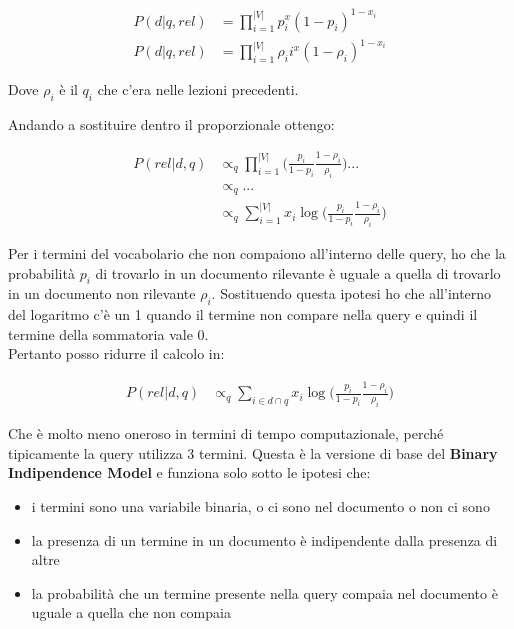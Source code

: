 \begin{align*}
P(d|q,rel) &= \prod\limits_{i = 1}^{|V|} p_{i}^x(1 - p_i)^{1-x_i} \\
P(d|q,rel) &= \prod\limits_{i = 1}^{|V|} \rho_i{i}^x(1 - \rho_i)^{1-x_i}
\end{align*}

\noindent Dove $\rho_i$ è il $q_i$ che c'era nelle lezioni precedenti.

Andando a sostituire dentro il proporzionale ottengo:

\begin{align*}
P(rel|d,q) &\propto_q \prod\limits_{i = 1}^{|V|} \Bigg(\frac{p_i}{1-p_i} \frac{1-\rho_i}{\rho_i}\Bigg) ... \\
		   &\propto_q ... \\
		   &\propto_q \sum\limits_{i=1}^{|V|} x_i \log \bigg( \frac{p_i}{1-p_i} \frac{1-\rho_i}{\rho_i} \bigg)
\end{align*}

\noindent Per i termini del vocabolario che non compaiono all'interno delle query, ho che la probabilità $p_i$ di trovarlo in un documento rilevante è uguale a quella di trovarlo in un documento non rilevante $\rho_i$.
Sostituendo questa ipotesi ho che all'interno del logaritmo c'è un 1 quando il termine non compare nella query e quindi il termine della sommatoria vale 0.\\

Pertanto posso ridurre il calcolo in:

\begin{align*}
P(rel|d,q) &\propto_q \sum\limits_{i \in d \cap q}  x_i \log \bigg( \frac{p_i}{1-p_i} \frac{1-\rho_i}{\rho_i} \bigg)
\end{align*}

\noindent Che è molto meno oneroso in termini di tempo computazionale, perché tipicamente la query utilizza 3 termini.
Questa è la versione di base del \textbf{Binary Indipendence Model} e funziona solo sotto le ipotesi che:

\begin{itemize}
	\item i termini sono una variabile binaria, o ci sono nel documento o non ci sono
	\item la presenza di un termine in un documento è indipendente dalla presenza di altre
	\item la probabilità che un termine presente nella query compaia nel documento è uguale a quella che non compaia
\end{itemize}

